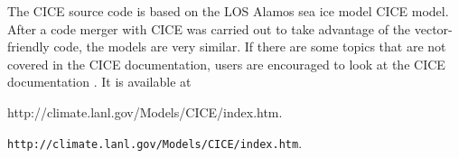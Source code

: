 The CICE source code is based on the LOS Alamos sea ice model CICE model.
After a code merger with CICE was carried out to take advantage of the vector-
friendly code, the models are very similar.  If there are some topics that
are not covered in the CICE documentation, users are encouraged to look
at the CICE documentation \cite{cice04}.  It is available at \\
\begin{htmlonly}
                    {http://climate.lanl.gov/Models/CICE/index.htm}.
\end{htmlonly}
\begin{latexonly}
                    {\tt http://climate.lanl.gov/Models/CICE/index.htm}.
\end{latexonly}

